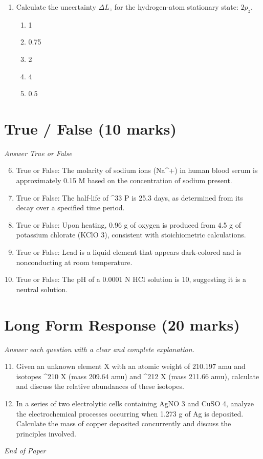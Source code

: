 \documentclass[12pt]{article}
\begin{document}
\begin{enumerate}[label=\arabic*.]
\begin{enumerate}[label=(\alph*)]
    \item CCl 2 F$_{2}$
    \item H$_{2}$O
    \item SF 6
\end{enumerate}
\item Calculate the uncertainty $\Delta L_z$ for the hydrogen-atom stationary state: $2 p_z$.
\begin{enumerate}[label=(\alph*)]
    \item 1
    \item 0.75
    \item 2
    \item 4
    \item 0.5
\end{enumerate}
\end{enumerate}

\section*{True / False (10 marks)}
\textit{Answer True or False}
\begin{enumerate}[label=\arabic*.]
\setcounter{enumi}{5}
\item True or False: The molarity of sodium ions (Na^+) in human blood serum is approximately 0.15 M based on the concentration of sodium present.
\item True or False: The half-life of ^33 P is 25.3 days, as determined from its decay over a specified time period.
\item True or False: Upon heating, 0.96 g of oxygen is produced from 4.5 g of potassium chlorate (KClO 3), consistent with stoichiometric calculations.
\item True or False: Lead is a liquid element that appears dark-colored and is nonconducting at room temperature.
\item True or False: The pH of a 0.0001 N HCl solution is 10, suggesting it is a neutral solution.
\end{enumerate}

\section*{Long Form Response (20 marks)}
\textit{Answer each question with a clear and complete explanation.}
\begin{enumerate}[label=\arabic*.]
\setcounter{enumi}{10}
\item Given an unknown element X with an atomic weight of 210.197 amu and isotopes ^210 X (mass 209.64 amu) and ^212 X (mass 211.66 amu), calculate and discuss the relative abundances of these isotopes.
\item In a series of two electrolytic cells containing AgNO 3 and CuSO 4, analyze the electrochemical processes occurring when 1.273 g of Ag is deposited. Calculate the mass of copper deposited concurrently and discuss the principles involved.
\end{enumerate}

\vfill
\noindent\textit{End of Paper}
\end{document}
